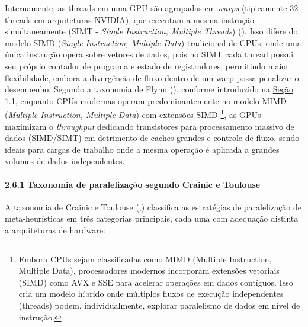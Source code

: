 Internamente, as threads em uma GPU são agrupadas em \emph{warps}
(tipicamente 32 threads em arquiteturas NVIDIA), que executam a mesma
instrução simultaneamente (SIMT - \emph{Single Instruction, Multiple
Threads}) (). Isso difere do modelo SIMD
(\emph{Single Instruction, Multiple Data}) tradicional de CPUs, onde uma
única instrução opera sobre vetores de dados, pois no SIMT cada thread
possui seu próprio contador de programa e estado de registradores,
permitindo maior flexibilidade, embora a divergência de fluxo dentro de
um warp possa penalizar o desempenho. Segundo a taxonomia de Flynn
(), conforme introduzido na
\hyperref[sec-11-contexto-e-motivacao]{Seção 1.1}, enquanto CPUs
modernas operam predominantemente no modelo MIMD (\emph{Multiple
Instruction, Multiple Data}) com extensões SIMD \footnote{Embora CPUs
  sejam classificadas como MIMD (Multiple Instruction, Multiple Data),
  processadores modernos incorporam extensões vetoriais (SIMD) como AVX
  e SSE para acelerar operações em dados contíguos. Isso cria um modelo
  híbrido onde múltiplos fluxos de execução independentes (threads)
  podem, individualmente, explorar paralelismo de dados em nível de
  instrução.}, as GPUs maximizam o \emph{throughput} dedicando
transistores para processamento massivo de dados (SIMD/SIMT) em
detrimento de caches grandes e controle de fluxo, sendo ideais para
cargas de trabalho onde a mesma operação é aplicada a grandes volumes de
dados independentes.

\paragraph{2.6.1 Taxonomia de paralelização segundo Crainic e
Toulouse}\label{sec-261-taxonomia-paralelizacao}

A taxonomia de Crainic e Toulouse
(,)
classifica as estratégias de paralelização de meta-heurísticas em três
categorias principais, cada uma com adequação distinta a arquiteturas de
hardware:


